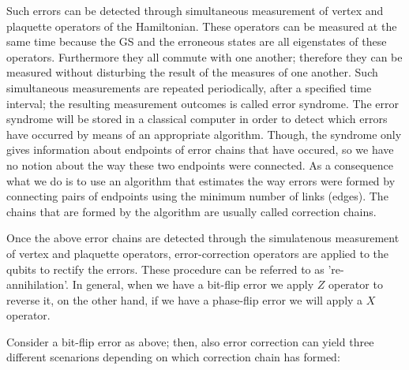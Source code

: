 \documentclass{Configuration_Files/PoliMi3i_thesis}
\begin{document}
Such errors can be detected through  simultaneous measurement of vertex and plaquette operators of the Hamiltonian. These operators can be measured at the same time because the GS and the erroneous states are all eigenstates of these operators. Furthermore they all commute with one another; therefore they can be measured without disturbing the result of the measures of one another.
Such simultaneous measurements are repeated periodically, after a specified time interval; the resulting measurement outcomes is called error syndrome. The error syndrome will be stored in a classical computer in order to detect which errors have occurred by means of an appropriate algorithm. Though, the syndrome only gives information about endpoints of error chains that have occured, so we have no notion about the way these two endpoints were connected. As a consequence what we do is to use an algorithm that estimates the way errors were formed by connecting pairs of endpoints using the minimum number of links (edges). The chains that are formed by the algorithm are usually called correction chains. \newline

Once the above error chains are detected through the simulatenous measurement of vertex and plaquette operators, error-correction operators  are applied to the qubits to rectify the errors. These procedure can be referred to as 're-annihilation'. In general, when we have a bit-flip error we apply $Z$ operator to reverse it, on the other hand, if we have a phase-flip error we will apply a $X$ operator. \newline

Consider a bit-flip error as above; then, also error correction can yield three different scenarions depending on which correction chain has formed: \newline
\end{document}
